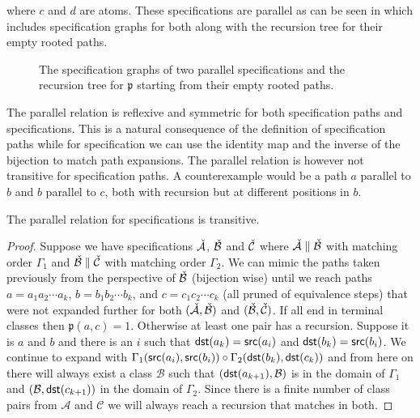 where $c$ and $d$ are atoms. These specifications are parallel as can be seen in  which includes specification graphs for both along with the recursion tree for their empty rooted paths.
\begin{figure}[ht!]
    \centering
    
    \vspace{0.7cm}
    
    \caption{The specification graphs of two parallel specifications and the recursion tree for $\mathfrak{p}$ starting from their empty rooted paths.}
    \label{fig:para_spec}
\end{figure}

The parallel relation is reflexive and symmetric for both specification paths and specifications. This is a natural consequence of the definition of specification paths while for specification we can use the identity map and the inverse of the bijection to match path expansions. The parallel relation is however not transitive for specification paths. A counterexample would be a path $a$ parallel to $b$ and $b$ parallel to $c$, both with recursion but at different positions in $b$.

\begin{proposition}
The parallel relation for specifications is transitive.
\end{proposition}
\begin{proof}
Suppose we have specifications $\check{\mathcal{A}}$, $\check{\mathcal{B}}$ and $\check{\mathcal{C}}$ where $\check{\mathcal{A}} \parallel \check{\mathcal{B}}$ with matching order $\Gamma_1$ and $\check{\mathcal{B}} \parallel \check{\mathcal{C}}$ with matching order $\Gamma_2$. We can mimic the paths taken previously from the perspective of $\check{\mathcal{B}}$ (bijection wise) until we reach paths $a = a_1a_2 \dotsm a_k$, $b = b_1b_2 \dotsm b_k$, and $c = c_1c_2 \dotsm c_k$ (all pruned of equivalence steps) that were not expanded further for both $(\check{\mathcal{A}},\check{\mathcal{B}})$ and $(\check{\mathcal{B}},\check{\mathcal{C}})$. If all end in terminal classes then $\mathfrak{p}(a,c)=1$. Otherwise at least one pair has a recursion. Suppose it is $a$ and $b$ and there is an $i$ such that $\textsf{dst}(a_k)=\textsf{src}(a_i)$ and $\textsf{dst}(b_k)=\textsf{src}(b_i)$. We continue to expand with $\Gamma_1(\textsf{src}(a_i),\textsf{src}(b_i)) \circ \Gamma_2(\textsf{dst}(b_k),\textsf{dst}(c_k))$ and from here on there will always exist a class $\mathcal{B}$ such that $(\textsf{dst}(a_{k+1}),\mathcal{B})$ is in the domain of $\Gamma_1$ and $(\mathcal{B}, \textsf{dst}(c_{k+1}))$ in the domain of $\Gamma_2$. Since there is a finite number of class pairs from $\mathcal{A}$ and $\mathcal{C}$ we will always reach a recursion that matches in both.
\end{proof}

